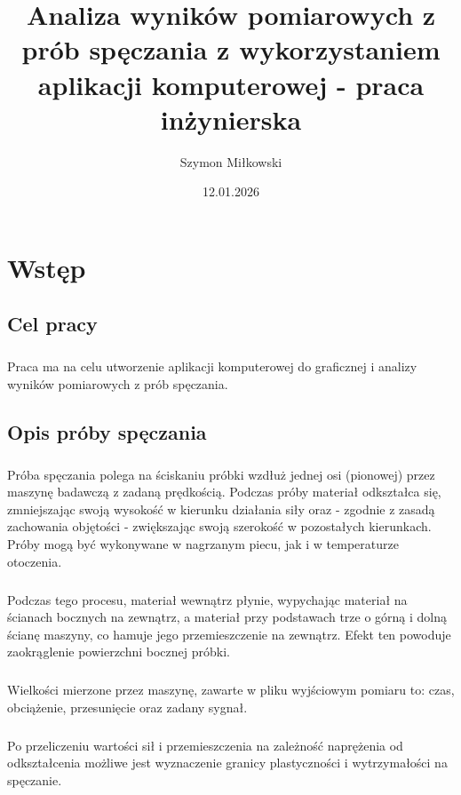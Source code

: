 \documentclass[12pt]{report}
\title{Analiza wyników pomiarowych z prób spęczania z wykorzystaniem aplikacji komputerowej - praca inżynierska}
\date{12.01.2026}
\author{Szymon Miłkowski}
\begin{document}
	
	\tableofcontents
	
	\chapter{Wstęp}
	\section{Cel pracy}
	\paragraph{}
	Praca ma na celu utworzenie aplikacji komputerowej do graficznej i analizy wyników pomiarowych z prób spęczania.
	
	\section{Opis próby spęczania}
	\paragraph{}
	Próba spęczania polega na ściskaniu próbki wzdłuż jednej osi (pionowej) przez maszynę
	badawczą z zadaną prędkością. Podczas próby materiał odkształca się, zmniejszając swoją
	wysokość w kierunku działania siły oraz - zgodnie z zasadą zachowania objętości - zwiększając swoją szerokość w pozostałych kierunkach. Próby mogą być wykonywane w nagrzanym piecu, jak i w temperaturze otoczenia.
	
	\paragraph{}
	Podczas tego procesu, materiał wewnątrz płynie, wypychając materiał na ścianach bocznych na zewnątrz, a materiał przy podstawach trze o górną i dolną ścianę maszyny, co
	hamuje jego przemieszczenie na zewnątrz. Efekt ten powoduje zaokrąglenie powierzchni bocznej próbki.
	
	\paragraph{}
	Wielkości mierzone przez maszynę, zawarte w pliku wyjściowym pomiaru to: czas, obciążenie, przesunięcie oraz zadany sygnał.
	
	\paragraph{}
	Po przeliczeniu wartości sił i przemieszczenia na zależność naprężenia od odkształcenia możliwe jest wyznaczenie granicy plastyczności i wytrzymałości na spęczanie.
	
\end{document}
